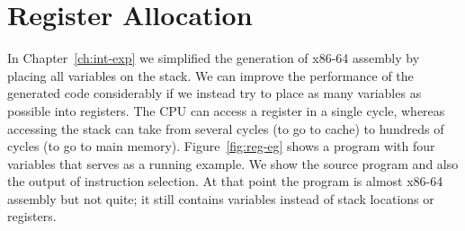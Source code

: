 \documentclass[11pt]{book}
\begin{document}



\chapter{Register Allocation}
\label{ch:register-allocation}

In Chapter~\ref{ch:int-exp} we simplified the generation of x86-64
assembly by placing all variables on the stack. We can improve the
performance of the generated code considerably if we instead try to
place as many variables as possible into registers.  The CPU can
access a register in a single cycle, whereas accessing the stack can
take from several cycles (to go to cache) to hundreds of cycles (to go
to main memory).  Figure~\ref{fig:reg-eg} shows a program with four
variables that serves as a running example. We show the source program
and also the output of instruction selection. At that point the
program is almost x86-64 assembly but not quite; it still contains
variables instead of stack locations or registers.
\end{document}
